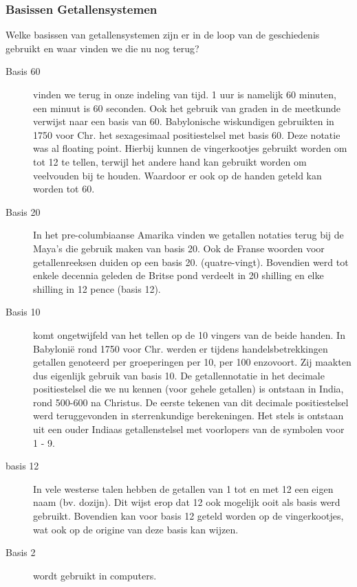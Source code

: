 \documentclass[../main.tex]{subfiles}
\begin{document}
\subsubsection{Basissen Getallensystemen}
\begin{question}
Welke basissen van getallensystemen zijn er in de loop van de geschiedenis gebruikt en waar vinden we die nu nog terug?
\end{question}

\begin{solution}
	\begin{description}
			\item[Basis 60] vinden we terug in onze indeling van tijd. 1 uur is namelijk 60 minuten, een minuut is 60 seconden. Ook het gebruik van graden in de meetkunde verwijst naar een basis van 60. Babylonische wiskundigen gebruikten in 1750 voor Chr. het sexagesimaal positiestelsel met basis 60. Deze notatie was al floating point. Hierbij kunnen de vingerkootjes gebruikt worden om tot 12 te tellen, terwijl het andere hand kan gebruikt worden om veelvouden bij te houden. Waardoor er ook op de handen geteld kan worden tot 60.
			\item[Basis 20] In het pre-columbiaanse Amarika vinden we getallen notaties terug bij de Maya's die gebruik maken van basis 20. Ook de Franse woorden voor getallenreeksen duiden op een basis 20.
			(quatre-vingt). Bovendien werd tot enkele decennia geleden de Britse pond verdeelt in 20 shilling en elke shilling in 12 pence (basis 12).
			\item[Basis 10] komt ongetwijfeld van het tellen op de 10 vingers van de beide handen. In Babyloni\"e rond 1750 voor Chr. werden er tijdens handelsbetrekkingen getallen genoteerd per groeperingen per 10, per 100 enzovoort. Zij maakten dus eigenlijk gebruik van basis 10. De getallennotatie in het decimale positiestelsel die we nu kennen (voor gehele getallen) is ontstaan in India, rond 500-600 na Christus. De eerste tekenen van dit decimale positiestelsel werd teruggevonden in sterrenkundige berekeningen. Het stels is ontstaan uit een ouder Indiaas getallenstelsel met voorlopers van de symbolen voor 1 - 9.
			\item[basis 12] In vele westerse talen hebben de getallen van 1 tot en met 12 een eigen naam (bv. dozijn). Dit wijst erop dat 12 ook mogelijk ooit als basis werd gebruikt. Bovendien kan voor basis 12 geteld worden op de vingerkootjes, wat ook op de origine van deze basis kan wijzen.
			\item[Basis 2] wordt gebruikt in computers.

	\end{description}
\end{solution}
\end{document}
